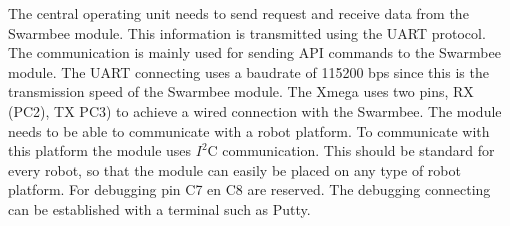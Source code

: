 \documentclass[10pt,a4paper]{article}
\begin{document}
The central operating unit needs to send request and receive data from the Swarmbee module. This information is transmitted using the UART protocol. The communication is mainly used for sending API commands to the Swarmbee module. The UART connecting uses a baudrate of 115200 bps since this is the transmission speed of the Swarmbee module. The Xmega uses two pins, RX (PC2), TX PC3) to achieve a wired connection with the Swarmbee. The module needs to be able to communicate with a robot platform. To communicate with this platform the module uses $I^2$C communication. This should be standard for every robot, so that the module can easily be placed on any type of robot platform.
For debugging pin C7 en C8 are reserved. The debugging connecting can be established with a terminal such as Putty.
\end{document}
